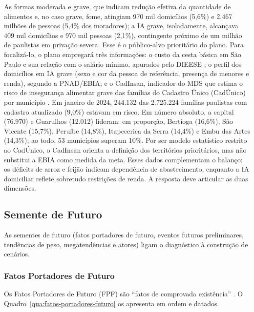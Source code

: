 \documentclass[
	12pt,				%
	openright,			%
	oneside,			%
	a4paper,			%
	chapter=TITLE,		%
	section=TITLE,		%
	english,			%
	french,				%
	spanish,			%
	brazil,				%
 ]{abntex2}
\begin{document}
As formas moderada e grave, que indicam redução efetiva da quantidade de
alimentos e, no caso grave, fome, atingiam 970 mil domicílios (5,6\%) e 2,467
milhões de pessoas (5,4\% dos moradores); a IA grave, isoladamente, alcançava
409 mil domicílios e 970 mil pessoas (2,1\%), contingente próximo de um milhão
de paulistas em privação severa. Esse é o público-alvo prioritário do plano.
Para focalizá-lo, o plano empregará três informações: o custo da cesta
básica em São Paulo e sua relação com o salário mínimo, apurados pelo DIEESE
\cite{dieese_cesta}; o perfil dos domicílios em IA grave (sexo e cor da pessoa
de referência, presença de menores e renda), segundo a PNAD/EBIA; e o
CadInsan, indicador do MDS que estima o risco de insegurança alimentar grave
das famílias do Cadastro Único (CadÚnico) por município \cite{mds_cadinsan2025}.
Em janeiro de 2024, 244.132 das 2.725.224 famílias paulistas com cadastro
atualizado (9,0\%) estavam em risco. Em número absoluto, a capital (76.970) e
Guarulhos (12.012) lideram; em proporção, Bertioga (16,6\%), São Vicente
(15,7\%), Peruíbe (14,8\%), Itapecerica da Serra (14,4\%) e Embu das Artes
(14,3\%); ao todo, 53 municípios superam 10\%. Por ser modelo estatístico
restrito ao CadÚnico, o CadInsan orienta a definição dos territórios
prioritários, mas não substitui a EBIA como medida da meta. Esses dados complementam o balanço: os déficits de
arroz e feijão indicam dependência de abastecimento, enquanto a IA domiciliar
reflete sobretudo restrições de renda. A resposta deve articular as duas
dimensões.

\subsection{Semente de Futuro}
As sementes de futuro (fatos portadores de futuro, eventos futuros
preliminares, tendências de peso, megatendências e atores) ligam o diagnóstico
à construção de cenários.

\subsubsection{Fatos Portadores de Futuro}
Os Fatos Portadores de Futuro (FPF) são ``fatos de comprovada existência''
\cite[p. 39]{esg_mpe2026}. O Quadro~\ref{qua:fatos-portadores-futuro} os
apresenta em ordem e datados.
\end{document}
